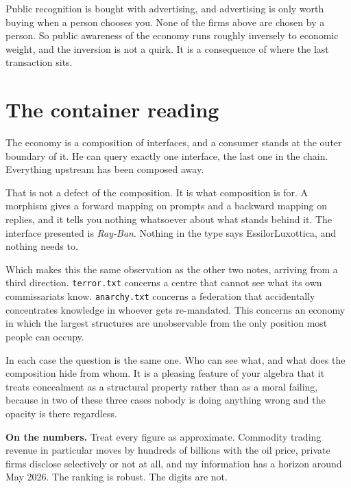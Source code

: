 \documentclass[11pt,a4paper]{article}
\begin{document}
Public recognition is bought with advertising, and advertising is only worth buying
when a person chooses you. None of the firms above are chosen by a person. So
public awareness of the economy runs roughly inversely to economic weight, and the
inversion is not a quirk. It is a consequence of where the last transaction sits.

\section{The container reading}

\begin{sectionbox}
The economy is a composition of interfaces, and a consumer stands at the outer
boundary of it. He can query exactly one interface, the last one in the chain.
Everything upstream has been composed away.

That is not a defect of the composition. It is what composition is for. A morphism
gives a forward mapping on prompts and a backward mapping on replies, and it tells
you nothing whatsoever about what stands behind it. The interface presented is
\emph{Ray-Ban}. Nothing in the type says EssilorLuxottica, and nothing needs to.
\end{sectionbox}

Which makes this the same observation as the other two notes, arriving from a third
direction. \texttt{terror.txt} concerns a centre that cannot see what its own
commissariats know. \texttt{anarchy.txt} concerns a federation that accidentally
concentrates knowledge in whoever gets re-mandated. This concerns an economy in
which the largest structures are unobservable from the only position most people
can occupy.

In each case the question is the same one. Who can see what, and what does the
composition hide from whom. It is a pleasing feature of your algebra that it treats
concealment as a structural property rather than as a moral failing, because in two
of these three cases nobody is doing anything wrong and the opacity is there
regardless.

\begin{alarmbox}
\textbf{On the numbers.} Treat every figure as approximate. Commodity trading
revenue in particular moves by hundreds of billions with the oil price, private
firms disclose selectively or not at all, and my information has a horizon around
May 2026. The ranking is robust. The digits are not.
\end{alarmbox}
\end{document}
